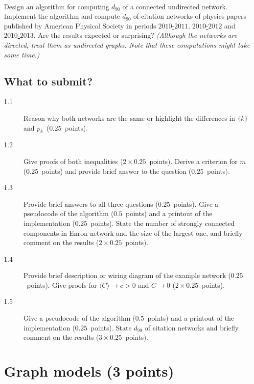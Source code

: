 \documentclass[11pt,a4paper]{article}
\newcommand{\avg}[1]{\langle#1\rangle}
\newcommand{\hint}[1]{{\it (#1)}}
\newcommand{\points}[1]{({\color{magenta}$#1$~points})}
\newcommand{\totals}[1]{({\color{magenta}#1 points})}
\begin{document}
\paragraph{} Design an algorithm for computing $d_{90}$ of a connected undirected network. Implement the algorithm and compute $d_{90}$ of citation networks of physics papers published by American Physical Society in periods \href{http://lovro.lpt.fri.uni-lj.si/ina/nets/aps_2010_2011}{$2010$-$2011$}, \href{http://lovro.lpt.fri.uni-lj.si/ina/nets/aps_2010_2013}{$2010$-$2012$} and \href{http://lovro.lpt.fri.uni-lj.si/ina/nets/aps_2010_2013}{$2010$-$2013$}. Are the results expected or surprising? \hint{Although the networks are directed, treat them as undirected graphs. Note that these computations might take some time.} 

\subsection*{What to submit?}

\begin{description}
	\item[1.1] Reason why both networks are the same or highlight the differences in $\{k\}$ and $p_k$~\points{0.25}.
	\item[1.2] Give proofs of both inequalities \points{2\times 0.25}. Derive a criterion for $m$ \points{0.25} and provide brief answer to the question \points{0.25}.
	\item[1.3] Provide brief answers to all three questions \points{0.25}. Give a pseudocode of the algorithm \points{0.5} and a printout of the implementation \points{0.25}. State the number of strongly connected components in Enron network and the size of the largest one, and briefly comment on the results \points{2\times 0.25}.
	\item[1.4] Provide brief description or wiring diagram of the example network \points{0.25}. Give proofs for $\avg{C}\rightarrow c>0$ and $C\rightarrow 0$ \points{2\times 0.25}.
	\item[1.5] Give a pseudocode of the algorithm \points{0.5} and a printout of the implementation \points{0.25}. State $d_{90}$ of citation networks and briefly comment on the results \points{3\times 0.25}.
\end{description}

\section{Graph models \totals{3}}
\end{document}
